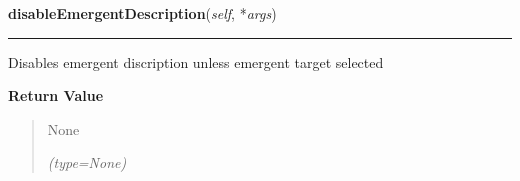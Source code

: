     \label{client_gui:GuiClass:disableEmergentDescription}

    \vspace{0.5ex}

\hspace{.8\funcindent}\begin{boxedminipage}{\funcwidth}

    \raggedright \textbf{disableEmergentDescription}(\textit{self}, *\textit{args})

    \vspace{-1.5ex}

    \rule{\textwidth}{0.5\fboxrule}
\setlength{\parskip}{2ex}
    Disables emergent discription unless emergent target selected

\setlength{\parskip}{1ex}
      \textbf{Return Value}
    \vspace{-1ex}

      \begin{quote}
      None

      {\it (type=None)}

      \end{quote}

    \end{boxedminipage}


